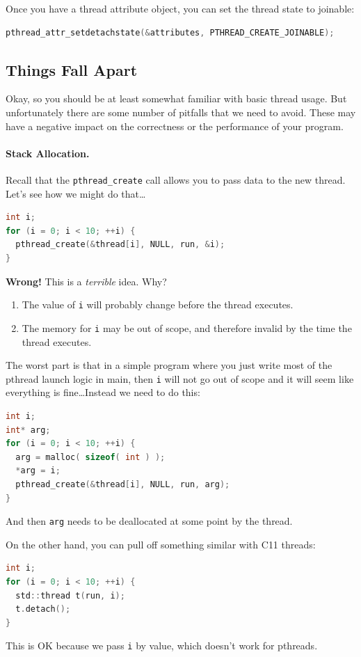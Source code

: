 \documentclass[a4paper]{report}
\newcommand{\CPP}{C\nolinebreak\hspace{-.05em}\raisebox{.4ex}{\tiny\bf +}\nolinebreak\hspace{-.10em}\raisebox{.4ex}{\tiny\bf +}}
\def\CPP{{C\nolinebreak[4]\hspace{-.05em}\raisebox{.4ex}{\tiny\bf ++}}}
\begin{document}
Once you have a thread attribute object, you can set the thread state to joinable:
  \begin{lstlisting}[language=C]
pthread_attr_setdetachstate(&attributes, PTHREAD_CREATE_JOINABLE);
  \end{lstlisting}

 

\subsection*{Things Fall Apart}
Okay, so you should be at least somewhat familiar with basic thread usage. But unfortunately there are some number of pitfalls that we need to avoid. These may have a negative impact on the correctness or the performance of your program.


\paragraph{Stack Allocation.} Recall that the {\tt pthread\_create} 
call allows you to pass data to the new thread. Let's see how we might do that\ldots

\begin{lstlisting}[language=C]
int i;
for (i = 0; i < 10; ++i) {
  pthread_create(&thread[i], NULL, run, &i);
}
\end{lstlisting}

{\bf Wrong!} This is a \emph{terrible} idea. Why?
\begin{enumerate}
    \item The value of {\tt i} will probably change before the thread executes.
    \item The memory for {\tt i} may be out of scope, and therefore invalid by
          the time the thread executes.
\end{enumerate}
The worst part is that in a simple program where you just write most of the pthread launch logic in main, then \texttt{i} will not go out of scope and it will seem like everything is fine\ldots Instead we need to do this:

\begin{lstlisting}[language=C]
int i;
int* arg;
for (i = 0; i < 10; ++i) {
  arg = malloc( sizeof( int ) );
  *arg = i;
  pthread_create(&thread[i], NULL, run, arg);
}
\end{lstlisting}

And then \texttt{arg} needs to be deallocated at some point by the thread.

On the other hand, you can pull off something similar with \CPP11 threads:
\begin{lstlisting}[language=C]
int i;
for (i = 0; i < 10; ++i) {
  std::thread t(run, i);
  t.detach();
}
\end{lstlisting}
This is OK because we pass {\tt i} by value, which doesn't work for pthreads.
\end{document}
